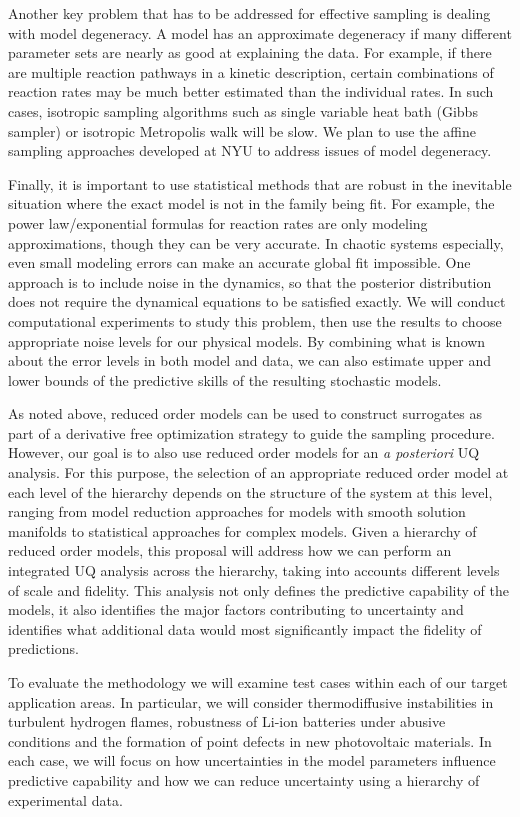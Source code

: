 \documentclass[11pt]{article}
\begin{document}
Another key problem that has to be addressed for effective sampling is dealing with model degeneracy.
A model has an approximate degeneracy if many different parameter sets are nearly as good at explaining the data.
For example, if there are multiple reaction pathways in a kinetic description,
certain combinations of reaction rates may be much better
estimated than the individual rates.
In such cases, isotropic sampling algorithms such as single variable heat bath (Gibbs sampler) or isotropic
Metropolis walk will be slow. We plan to use the affine sampling approaches developed at NYU to address issues of model degeneracy.

Finally, it is important to use statistical methods that are robust in the inevitable situation where the exact model is not in
the family being fit.
For example, the power law/exponential formulas for reaction rates are only modeling approximations, though they can be
very accurate.
In chaotic systems especially, even small modeling errors can make an accurate global fit impossible.
One approach is to include noise in the dynamics, so that the posterior distribution does not require the
dynamical equations to be satisfied exactly.
We will conduct computational experiments to study this problem, then use the results to 
choose appropriate noise levels for our physical models.
By combining what is known about the error levels in both model and data, we can also estimate upper and lower bounds
of the predictive skills of the resulting stochastic models.

As noted above, reduced order models can be used to construct surrogates as part of a derivative free optimization strategy
to guide the sampling procedure. However, our goal is to also use reduced order models for an {\it {a posteriori}} UQ analysis.
For this purpose, the selection of an appropriate reduced order model at each level of the hierarchy depends on the
structure of the system at this level, ranging from model reduction approaches for models with smooth solution manifolds
to statistical approaches for complex models.
Given a hierarchy of reduced order models, this proposal will address how we can perform an integrated UQ analysis 
across the hierarchy, taking into accounts different levels of scale and fidelity.
This analysis not only defines the predictive capability of the models, it also identifies
the major factors contributing to uncertainty and identifies what additional data would most significantly
impact the fidelity of predictions.

To evaluate the methodology we will examine test cases within each of our target application areas.  In particular,
we will consider thermodiffusive instabilities in turbulent hydrogen flames, robustness of Li-ion batteries under abusive conditions
and the formation of point defects in new photovoltaic materials.  In each case, we will focus on how uncertainties in the 
model parameters influence predictive capability and how we can reduce uncertainty using a hierarchy of experimental data.
\end{document}

